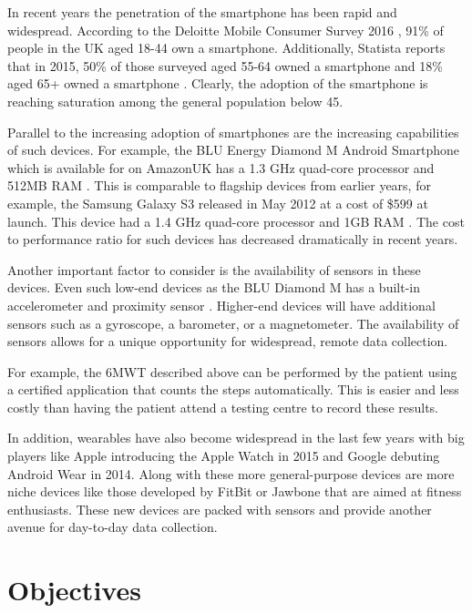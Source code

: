             In recent years the penetration of the smartphone has been rapid and widespread. According to the Deloitte Mobile Consumer Survey 2016 \cite{deloitte}, 91\% of people in the UK aged 18-44 own a smartphone. Additionally, Statista reports that in 2015, 50\% of those surveyed aged 55-64 owned a smartphone and 18\% aged 65+ owned a smartphone \cite{statista}. Clearly, the adoption of the smartphone is reaching saturation among the general population below 45.

            Parallel to the increasing adoption of smartphones are the increasing capabilities of such devices. For example, the BLU Energy Diamond M Android Smartphone which is available for  on AmazonUK has a 1.3 GHz quad-core processor and 512MB RAM \cite{new_phone}. This is comparable to flagship devices from earlier years, for example, the Samsung Galaxy S3 released in May 2012 at a cost of \$599 at launch. This device had a 1.4 GHz quad-core processor and 1GB RAM \cite{samsung}. The cost to performance ratio for such devices has decreased dramatically in recent years.

            Another important factor to consider is the availability of sensors in these devices. Even such low-end devices as the BLU Diamond M has a built-in accelerometer and proximity sensor \cite{new_phone}. Higher-end devices will have additional sensors such as a gyroscope, a barometer, or a magnetometer. The availability of sensors allows for a unique opportunity for widespread, remote data collection. 

            For example, the 6MWT described above can be performed by the patient using a certified application that counts the steps automatically. This is easier and less costly than having the patient attend a testing centre to record these results.

            In addition, wearables have also become widespread in the last few years with big players like Apple introducing the Apple Watch in 2015 and Google debuting Android Wear in 2014. Along with these more general-purpose devices are more niche devices like those developed by FitBit or Jawbone that are aimed at fitness enthusiasts. These new devices are packed with sensors and provide another avenue for day-to-day data collection.

    \chapter{Objectives}


